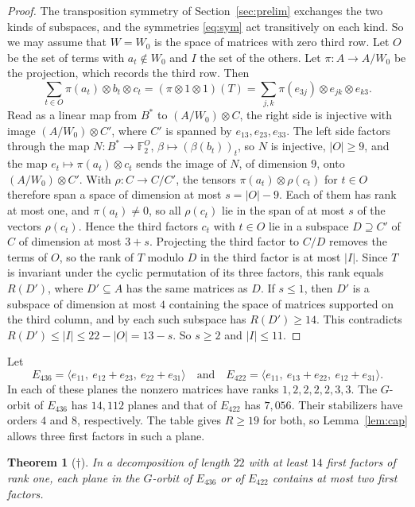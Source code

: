 \documentclass[11pt]{amsart}
\newtheorem{theorem}{Theorem}[section]
\theoremstyle{definition}
\theoremstyle{remark}
\numberwithin{equation}{section}
\newcommand{\F}{\mathbb{F}_2}
\begin{document}
\begin{proof}
The transposition symmetry of Section~\ref{sec:prelim} exchanges the two kinds of subspaces, and the symmetries \eqref{eq:sym} act transitively on each kind. So we may assume that $W=W_0$ is the space of matrices with zero third row. Let $O$ be the set of terms with $a_t\notin W_0$ and $I$ the set of the others. Let $\pi\colon A\to A/W_0$ be the projection, which records the third row. Then
\[
\sum_{t\in O}\pi(a_t)\otimes b_t\otimes c_t=(\pi\otimes 1\otimes 1)(T)=\sum_{j,k}\pi(e_{3j})\otimes e_{jk}\otimes e_{k3}.
\]
Read as a linear map from $B^*$ to $(A/W_0)\otimes C$, the right side is injective with image $(A/W_0)\otimes C'$, where $C'$ is spanned by $e_{13},e_{23},e_{33}$. The left side factors through the map $N\colon B^*\to\F^{O}$, $\beta\mapsto(\beta(b_t))_t$, so $N$ is injective, $|O|\ge 9$, and the map $e_t\mapsto\pi(a_t)\otimes c_t$ sends the image of $N$, of dimension $9$, onto $(A/W_0)\otimes C'$. With $\rho\colon C\to C/C'$, the tensors $\pi(a_t)\otimes\rho(c_t)$ for $t\in O$ therefore span a space of dimension at most $s=|O|-9$. Each of them has rank at most one, and $\pi(a_t)\ne 0$, so all $\rho(c_t)$ lie in the span of at most $s$ of the vectors $\rho(c_t)$. Hence the third factors $c_t$ with $t\in O$ lie in a subspace $D\supseteq C'$ of $C$ of dimension at most $3+s$. Projecting the third factor to $C/D$ removes the terms of $O$, so the rank of $T$ modulo $D$ in the third factor is at most $|I|$. Since $T$ is invariant under the cyclic permutation of its three factors, this rank equals $R(D')$, where $D'\subseteq A$ has the same matrices as $D$. If $s\le 1$, then $D'$ is a subspace of dimension at most $4$ containing the space of matrices supported on the third column, and by \cite{RR26} each such subspace has $R(D')\ge 14$. This contradicts $R(D')\le|I|\le 22-|O|=13-s$. So $s\ge 2$ and $|I|\le 11$.
\end{proof}

Let
\[
E_{436}=\langle e_{11},\ e_{12}+e_{23},\ e_{22}+e_{31}\rangle\quad\text{and}\quad E_{422}=\langle e_{11},\ e_{13}+e_{22},\ e_{12}+e_{31}\rangle .
\]
In each of these planes the nonzero matrices have ranks $1,2,2,2,2,3,3$. The $G$-orbit of $E_{436}$ has $14{,}112$ planes and that of $E_{422}$ has $7{,}056$. Their stabilizers have orders $4$ and $8$, respectively. The table gives $R\ge 19$ for both, so Lemma~\ref{lem:cap} allows three first factors in such a plane.

\begin{theorem}[$\dagger$]\label{thm:planes}
In a decomposition of length $22$ with at least $14$ first factors of rank one, each plane in the $G$-orbit of $E_{436}$ or of $E_{422}$ contains at most two first factors.
\end{theorem}
\end{document}
